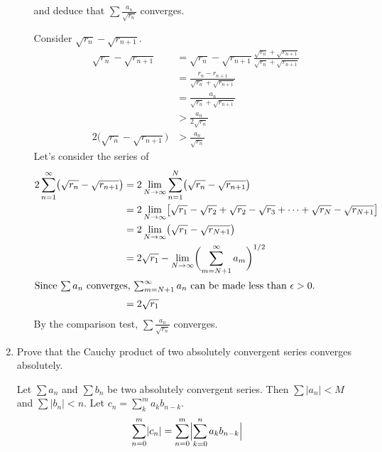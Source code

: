 \begin{enumerate}
\begin{enumerate}[label = (\alph*)]
\[    \]
    and deduce that \(\sum\frac{a_n}{\sqrt{r_n}}\) converges.
    \par\smallskip
    Consider \(\sqrt{r_n} - \sqrt{r_{n + 1}}\).
    \begin{align*}
      \sqrt{r_n} - \sqrt{r_{n + 1}}
      & = \sqrt{r_n} - \sqrt{r_{n + 1}}
        \frac{\sqrt{r_n} + \sqrt{r_{n + 1}}}{\sqrt{r_n} + \sqrt{r_{n + 1}}}\\
      & = \frac{r_n - r_{n + 1}}{\sqrt{r_n} + \sqrt{r_{n + 1}}}\\
      & = \frac{a_n}{\sqrt{r_n} + \sqrt{r_{n + 1}}}\\
      & > \frac{a_n}{2\sqrt{r_n}}\\
      2\bigl(\sqrt{r_n} - \sqrt{r_{n + 1}}\bigr) & > \frac{a_n}{\sqrt{r_n}}
    \end{align*}
    Let's consider the series of
    \begin{align*}
      2\sum_{n = 1}^{\infty}\bigl(\sqrt{r_n} - \sqrt{r_{n + 1}}\bigr)
      & = 2\lim_{N\to\infty}\sum_{n = 1}^N
        \bigl(\sqrt{r_n} - \sqrt{r_{n + 1}}\bigr)\\
      & = 2\lim_{N\to\infty}\bigl[\sqrt{r_1} - \sqrt{r_2} + \sqrt{r_2} -
        \sqrt{r_3} + \cdots + \sqrt{r_N} - \sqrt{r_{N + 1}}\bigr]\\
      & = 2\lim_{N\to\infty}\bigl(\sqrt{r_1} - \sqrt{r_{N + 1}}\bigr)\\
      & = 2\sqrt{r_1} - \lim_{N\to\infty}
        \biggl(\sum_{m = N + 1}^{\infty}a_m\biggr)^{1/2}\\
      \intertext{Since \(\sum a_n\) converges, \(\sum_{m = N + 1}^{\infty}a_n\)
      can be made less than \(\epsilon > 0\).}
      & = 2\sqrt{r_1}
    \end{align*}
    By the comparison test, \(\sum\frac{a_n}{\sqrt{r_n}}\) converges.
  \end{enumerate}
\item
  Prove that the Cauchy product of two absolutely convergent series converges
  absolutely.
  \par\smallskip
  Let \(\sum a_n\) and \(\sum b_n\) be two absolutely convergent series.
  Then \(\sum\lvert a_n\rvert < M\) and \(\sum\lvert b_n\rvert < n\).
  Let \(c_n = \sum_k^ma_kb_{n - k}\).
  \begin{align*}
    \sum_{n = 0}^m\lvert c_n\rvert
    & = \sum_{n = 0}^m\Bigl\lvert\sum_{k = 0}^n a_kb_{n - k}\Bigr\rvert\\

\end{align*}
\end{enumerate}
